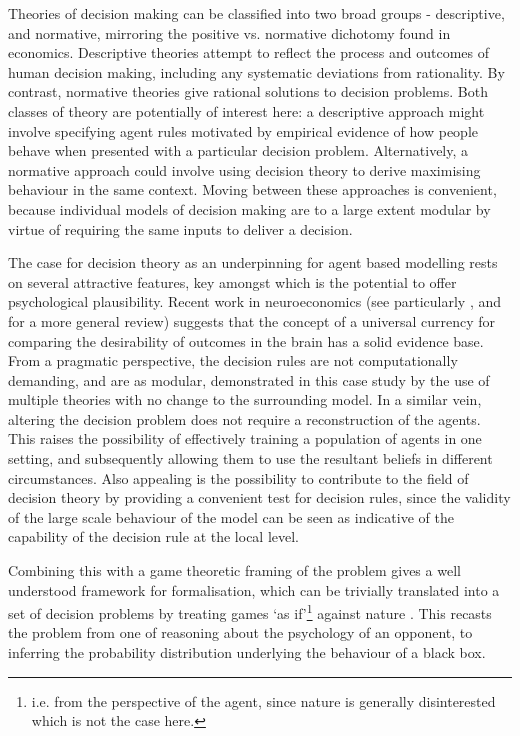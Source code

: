 \documentclass[twocolumn]{article}
\begin{document}
Theories of decision making can be classified into two broad groups - descriptive, and normative, mirroring the positive vs. normative dichotomy found in economics. Descriptive theories attempt to reflect the process and outcomes of human decision making, including any systematic deviations from rationality. By contrast, normative theories give rational solutions to decision problems. Both classes of theory are potentially of interest here: a descriptive approach might involve specifying agent rules motivated by empirical evidence of how people behave when presented with a particular decision problem. Alternatively, a normative approach could involve using decision theory to derive maximising behaviour in the same context.
Moving between these approaches is convenient, because individual models of decision making are to a large extent modular by virtue of requiring the same inputs to deliver a decision. 

The case for decision theory as an underpinning for agent based modelling rests on several attractive features, key amongst which is the potential to offer psychological plausibility. Recent work in neuroeconomics (see particularly \citep{Padoa-Schioppa2006}, and \citep{Rustichini2009} for a more general review) suggests that the concept of a universal currency for comparing the desirability of outcomes in the brain has a solid evidence base.  
From a pragmatic perspective, the decision rules are not computationally demanding, and are as modular, demonstrated in this case study by the use of multiple theories with no change to the surrounding model.  In a similar vein, altering the decision problem does not require a reconstruction of the agents. This raises the possibility of effectively training a population of agents in one setting, and subsequently allowing them to use the resultant beliefs in different circumstances. Also appealing is the possibility to contribute to the field of decision theory by providing a convenient test for decision rules, since the validity of the large scale behaviour of the model can be seen as indicative of the capability of the decision rule at the local level.

Combining this with a game theoretic framing of the problem gives a well understood framework for formalisation, which can be trivially translated into a set of decision problems by treating games `as if'\footnote{i.e. from the perspective of the agent, since nature is generally disinterested which is not the case here.} against nature \citep{RiosInsua2009}. This recasts the problem from one of reasoning about the psychology of an opponent, to inferring the probability distribution underlying the behaviour of a black box.
\end{document}
